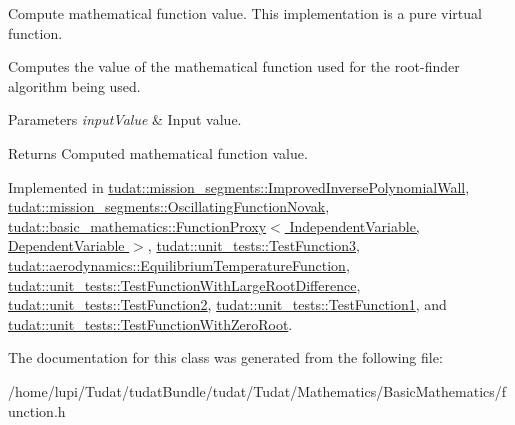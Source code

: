 Compute mathematical function value. This implementation is a pure virtual function. 

Computes the value of the mathematical function used for the root-\/finder algorithm being used. 
\begin{DoxyParams}{Parameters}
{\em input\+Value} & Input value. \\
\hline
\end{DoxyParams}
\begin{DoxyReturn}{Returns}
Computed mathematical function value. 
\end{DoxyReturn}


Implemented in \hyperlink{classtudat_1_1mission__segments_1_1ImprovedInversePolynomialWall_a9fe09f98e8bb360bba7b90d5462150ca}{tudat\+::mission\+\_\+segments\+::\+Improved\+Inverse\+Polynomial\+Wall}, \hyperlink{classtudat_1_1mission__segments_1_1OscillatingFunctionNovak_a3d0ac0b2d7a09ed14894740fab68a0e6}{tudat\+::mission\+\_\+segments\+::\+Oscillating\+Function\+Novak}, \hyperlink{classtudat_1_1basic__mathematics_1_1FunctionProxy_ab8ef1b8407695652bb20416bbbf5909c}{tudat\+::basic\+\_\+mathematics\+::\+Function\+Proxy$<$ Independent\+Variable, Dependent\+Variable $>$}, \hyperlink{structtudat_1_1unit__tests_1_1TestFunction3_a4ffdf6e236017692b9ee4b9fcf9d3f00}{tudat\+::unit\+\_\+tests\+::\+Test\+Function3}, \hyperlink{classtudat_1_1aerodynamics_1_1EquilibriumTemperatureFunction_abd89b7690138e463bcc52ebd667f7bfa}{tudat\+::aerodynamics\+::\+Equilibrium\+Temperature\+Function}, \hyperlink{structtudat_1_1unit__tests_1_1TestFunctionWithLargeRootDifference_a60e68f6399dbcd0204dba345f8fac4cd}{tudat\+::unit\+\_\+tests\+::\+Test\+Function\+With\+Large\+Root\+Difference}, \hyperlink{structtudat_1_1unit__tests_1_1TestFunction2_af48f8ec9949c4a3fd79600e945490c9b}{tudat\+::unit\+\_\+tests\+::\+Test\+Function2}, \hyperlink{structtudat_1_1unit__tests_1_1TestFunction1_ac8b0089177fd73eac4cc3f4cf80807ec}{tudat\+::unit\+\_\+tests\+::\+Test\+Function1}, and \hyperlink{structtudat_1_1unit__tests_1_1TestFunctionWithZeroRoot_a48ea1d8818820199485e588721d198f1}{tudat\+::unit\+\_\+tests\+::\+Test\+Function\+With\+Zero\+Root}.



The documentation for this class was generated from the following file\+:\begin{DoxyCompactItemize}
\item 
/home/lupi/\+Tudat/tudat\+Bundle/tudat/\+Tudat/\+Mathematics/\+Basic\+Mathematics/function.\+h\end{DoxyCompactItemize}
